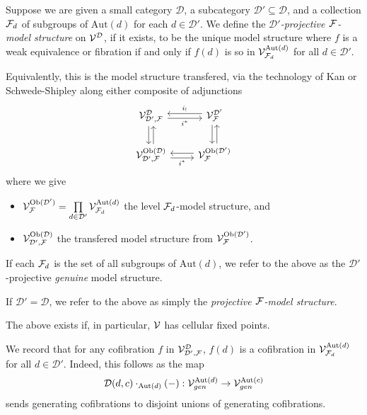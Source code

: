 \documentclass[a4paper,10pt]{article}%
\begin{document}
\begin{definition}
  \label{SUBD_PROJ_F_MODEL_STRUCTURE}
  Suppose we are given a small category $\mathcal D$, a subcategory $\mathcal D' \subseteq \mathcal D$, and a collection $\mathcal F_d$ of subgroups of $\mathrm{Aut}(d)$ for each $d\in \mathcal D'$. We define the \textit{$\mathcal D'$-projective $\mathcal F$-model structure} on $\mathcal V^{\mathcal D}$, if it exists, to be the unique model structure where $f$ is a weak equivalence or fibration if and only if $f(d)$ is so in $\mathcal V^{\mathrm{Aut}(d)}_{\mathcal F_d}$ for all $d\in \mathcal D'$. 

Equivalently, this is the model structure transfered, via the technology of Kan \cite[11.6.1]{Hi03} or Schwede-Shipley \cite[2.3]{SS00} along either composite of adjunctions
  \[
  \begin{tikzcd}
    \V^{\mathcal D}_{\mathcal D', \F} \arrow[d, shift right] \arrow[r, shift right, "i^*"'] & \V^{\mathcal D'}_\F \arrow[l, shift right, "i_!"'] \arrow[d, shift right]\\
    \V^{\mathrm{Ob}(\mathcal D)}_{\mathcal D', \F} \arrow[r, shift right, "i^*"'] \arrow[u, shift right] & \V^{\mathrm{Ob}(\mathcal D')}_{\F} \arrow[l, shift right] \arrow[u, shift right]
  \end{tikzcd}
  \]
  where we give
  \begin{itemize}
  \item $\mathcal V^{\mathrm{Ob}(\mathcal D')}_{\mathcal F} = \mathop{\prod}\limits_{d\in \mathcal D'}\mathcal V^{\mathrm{Aut}(d)}_{\mathcal F_d}$ the level $\mathcal F_d$-model structure, and
  \item $\mathcal V^{\mathrm{Ob}(\mathcal D)}_{\mathcal D', \mathcal F}$ the transfered model structure from $\mathcal V^{\mathrm{Ob}(\mathcal D')}_{\mathcal F}$.
  \end{itemize}
  
  If each $\mathcal F_d$ is the set of all subgroups of $\mathrm{Aut}(d)$, we refer to the above as the $\mathcal D'$-projective \textit{genuine} model structure. 

  If $\mathcal D' = \mathcal D$, we refer to the above as simply the \textit{projective $\mathcal F$-model structure}.
\end{definition}


The above exists if, in particular, $\mathcal V$ has cellular fixed points.

\begin{remark}
  \label{LEVEL_COFIB_REMARK}
  We record that for any cofibration $f$ in $\mathcal V^{\mathcal D}_{\mathcal D', \mathcal F}$, $f(d)$ is a cofibration in $\mathcal V^{\mathrm{Aut}(d)}_{\mathcal F_d}$ for all $d\in \mathcal D'$. Indeed, this follows as the map
  \[
  \mathcal D(d,c) \cdot_{\mathrm{Aut}(d)}(-): \mathcal V^{\mathrm{Aut}(d)}_{gen} \to \mathcal V^{\mathrm{Aut}(c)}_{gen}
  \]
  sends generating cofibrations to disjoint unions of generating cofibrations.
\end{remark}
\end{document}
